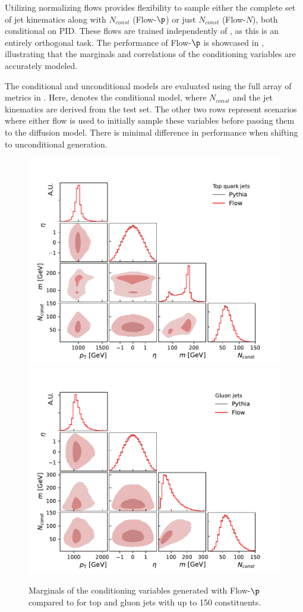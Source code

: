 Utilizing normalizing flows provides flexibility to sample either the complete set of jet kinematics along with $N_{const}$ (Flow-$\p$) or just $N_{const}$ (Flow-$N$), both conditional on PID.
These flows are trained independently of \pcdroid, as this is an entirely orthogonal task.
The performance of Flow-$\p$ is showcased in , illustrating that the marginals and correlations of the conditioning variables are accurately modeled.

The conditional and unconditional models are evaluated using the full array of metrics in .
Here, \pcdroid denotes the conditional model, where $N_{const}$ and the jet kinematics are derived from the test set.
The other two rows represent scenarios where either flow is used to initially sample these variables before passing them to the diffusion model.
There is minimal difference in performance when shifting to unconditional generation.

\begin{figure}[b!]
    \centering
    \includegraphics[width=0.49\linewidth]{Figures/jet_generation/droid/150/flow_quality_t.pdf}
    \includegraphics[width=0.49\linewidth]{Figures/jet_generation/droid/150/flow_quality_g.pdf}
    \caption{Marginals of the conditioning variables generated with Flow-$\p$ compared to \pythia for top and gluon jets with up to 150 constituents.
    }
    \label{fig:unconditional-flows}
\end{figure}


